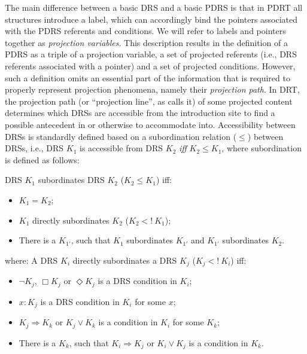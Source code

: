 The main difference between a basic DRS and a basic PDRS is that in PDRT all
structures introduce a label, which can accordingly bind the pointers
associated with the PDRS referents and conditions. We will refer to labels
and pointers together as \textit{projection variables}. This description
results in the definition of a PDRS as a triple of a projection variable,
a set of projected referents (i.e., DRS referents associated with a pointer)
and a set of projected conditions. However, such a definition omits an
essential part of the information that is required to properly represent
projection phenomena, namely their \emph{projection path}. In DRT, the
projection path (or ``projection line'', as
 calls it) of some projected content
determines which DRSs are accessible from the introduction site to find
a possible antecedent in or otherwise to accommodate into. Accessibility
between DRSs is standardly defined based on a subordination relation
($\leq$) between DRSs, i.e., DRS $K_1$ is accessible from DRS $K_2$
\textit{iff} $K_2\leq K_1$, where subordination is defined as follows:

\begin{definition}
DRS $K_1$ subordinates DRS $K_2$ ($K_2 \leq K_1$) iff:
  \begin{itemize}
    \item $K_1 = K_2$;
    \item $K_1$ directly subordinates $K_2$ ($K_2 <!~K_1$);
    \item There is a $K_{1'}$, such that $K_1$ subordinates $K_{1'}$ and 
      $K_{1'}$ subordinates $K_2$.
  \end{itemize}
  where: A DRS $K_i$ directly subordinates a DRS $K_j$ ($K_j <!~K_i$) iff:
  \begin{itemize}
    \item $\neg K_j$, $\Box K_j$ or $\Diamond K_j$ is a DRS condition in
      $K_i$;
    \item $x:K_j$ is a DRS condition in $K_i$ for some $x$;
    \item $K_j \Rightarrow K_k$ or $K_j \vee K_k$ is a condition in $K_i$
      for some $K_k$;
    \item There is a $K_k$, such that $K_i \Rightarrow K_j$ or $K_i \vee K_j$
      is a condition in $K_k$.
  \end{itemize}
\end{definition}

